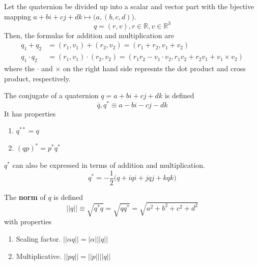 \documentclass{article}
\begin{document}
    \begin{proposition}
      Let the quaternion be divided up into a scalar and vector part with the bjective mapping $a + bi + cj + dk \mapsto \big(a, (b, c, d)\big)$. 
      \begin{equation}
        q = (r, v), r \in \mathbb{R}, v \in \mathbb{R}^3
      \end{equation}
      Then, the formulas for addition and multiplication are
      \begin{align*}
        q_1 + q_2 & = (r_1, v_1) + (r_2, v_2) = (r_1 + r_2, v_1 + v_2) \\
        q_1 \cdot q_2 & = (r_1, v_1) \cdot (r_2, v_2) = (r_1 r_2 - v_1 \cdot v_2, r_1 v_2 + r_2 v_1 + v_1 \times v_2)
      \end{align*}
      where the $\cdot$ and $\times$ on the right hand side represnts the dot product and cross product, respectively. 
    \end{proposition}

    \begin{definition}
      The conjugate of a quaternion $q = a + bi + cj + dk$ is defined 
      \begin{equation}
        \bar{q}, q^* \equiv a - bi - cj - dk
      \end{equation}
      It has properties
      \begin{enumerate}
        \item $q^{**} = q$
        \item $(q p)^* = p^* q^*$
      \end{enumerate}
      $q^*$ can also be expressed in terms of addition and multiplication. 
      \begin{equation}
        q^* = -\frac{1}{2} \big( q + iqi + jqj + kqk \big)
      \end{equation}
    \end{definition}

    \begin{definition}
      The \textbf{norm} of $q$ is defined
      \begin{equation}
        ||q|| \equiv \sqrt{q^* q} = \sqrt{q q^*} = \sqrt{a^2 + b^2 + c^2 + d^2}
      \end{equation}
      with properties
      \begin{enumerate}
        \item Scaling factor. $||\alpha q|| = |\alpha| ||q||$
        \item Multiplicative. $||p q|| = ||p|| ||q||$
      \end{enumerate}
    \end{definition}
\end{document}
